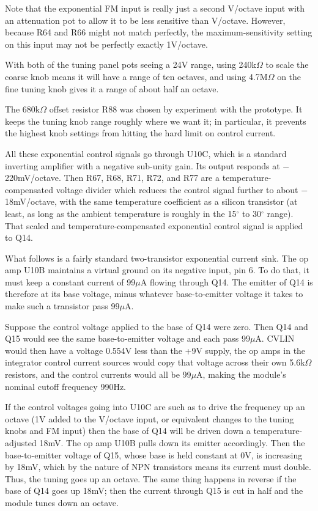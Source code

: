 Note that the exponential FM input is really just a second V/octave input with
an attenuation pot to allow it to be less sensitive than V/octave.  However,
because R64 and R66 might not match perfectly, the maximum-sensitivity
setting on this input may not be perfectly exactly 1V/octave.

With both of the tuning panel pots seeing a 24V range, using 240k$\Omega$ to
scale the coarse knob means it will have a range of ten octaves, and using
4.7M$\Omega$ on the fine tuning knob gives it a range of about half an
octave.

The 680k$\Omega$ offset resistor R88 was chosen by experiment with the
prototype.  It keeps the tuning knob range roughly where we want it; in
particular, it prevents the highest knob settings from hitting the hard
limit on control current.

All these exponential control signals go through U10C, which is a standard
inverting amplifier with a negative sub-unity gain.  Its output responds at
$-$220mV/octave.  Then R67, R68, R71, R72, and R77 are a
temperature-compensated voltage divider which reduces the control signal
further to about $-$18mV/octave, with the same temperature coefficient as a
silicon transistor (at least, as long as the ambient temperature is roughly
in the 15$^\circ$ to 30$^\circ$ range).  That scaled and
temperature-compensated exponential control signal is applied to
Q14.

What follows is a fairly standard two-transistor exponential current sink. 
The op amp U10B maintains a virtual ground on its negative input, pin 6.  To
do that, it must keep a constant current of 99$\mu$A flowing through Q14. 
The emitter of Q14 is therefore at its base voltage, minus whatever
base-to-emitter voltage it takes to make such a transistor pass 99$\mu$A.

Suppose the control voltage applied to the base of Q14 were zero.  Then Q14
and Q15 would see the same base-to-emitter voltage and each pass 99$\mu$A. 
CVLIN would then have a voltage 0.554V less than the +9V supply, the op amps
in the integrator control current sources would copy that voltage across
their own 5.6k$\Omega$ resistors, and the control currents would all be
99$\mu$A, making the module's nominal cutoff frequency 990Hz.

If the control voltages going into U10C are such as to drive the frequency
up an octave (1V added to the V/octave input, or equivalent changes to the
tuning knobs and FM input) then the base of Q14 will be driven down a
temperature-adjusted 18mV.  The op amp U10B pulls down its emitter
accordingly.  Then the base-to-emitter voltage of Q15, whose base is held
constant at 0V, is increasing by 18mV, which by the nature of NPN
transistors means its current must double.  Thus, the tuning goes up an
octave.  The same thing happens in reverse if the base of Q14 goes up 18mV;
then the current through Q15 is cut in half and the module tunes down an
octave.

